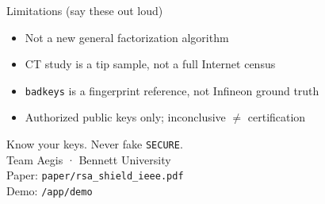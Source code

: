 \documentclass[aspectratio=169,11pt]{beamer}
\begin{document}
\begin{frame}{Limitations (say these out loud)}
  \begin{itemize}
    \item Not a new general factorization algorithm
    \item CT study is a tip sample, not a full Internet census
    \item \texttt{badkeys} is a fingerprint reference, not Infineon ground truth
    \item Authorized public keys only; inconclusive $\neq$ certification
  \end{itemize}
\end{frame}

\begin{frame}
  \centering
  \vspace{1.5em}
  {\LARGE Know your keys. Never fake \texttt{SECURE}.}\\[1.2em]
  Team Aegis · Bennett University\\[0.6em]
  Paper: \texttt{paper/rsa\_shield\_ieee.pdf}\\
  Demo: \texttt{/app/demo}
\end{frame}
\end{document}
